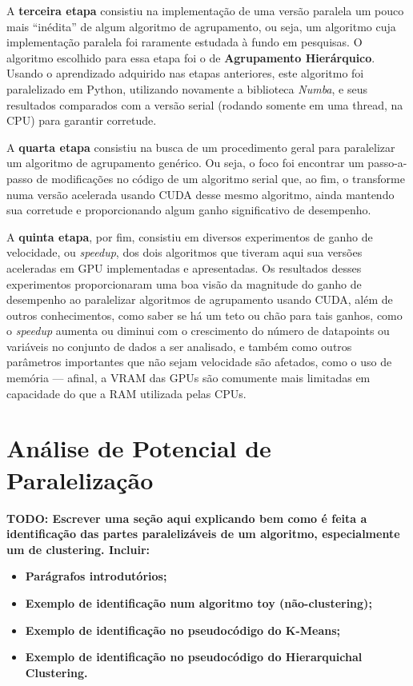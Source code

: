 \documentclass[12pt,
openright, 
oneside, %
a4paper,    %
brazil]{facom-ufu-abntex2}
\def\qntAlgrtm{dois}
\begin{document}
A \textbf{terceira etapa} consistiu na implementação de uma versão paralela um pouco mais \enquote{inédita} de algum algoritmo de agrupamento, ou seja, um algoritmo cuja implementação paralela foi raramente estudada à fundo em pesquisas. O algoritmo escolhido para essa etapa foi o de \textbf{Agrupamento Hierárquico}. Usando o aprendizado adquirido nas etapas anteriores, este algoritmo foi paralelizado em Python, utilizando novamente a biblioteca \textit{Numba}, e seus resultados comparados com a versão serial (rodando somente em uma thread, na CPU) para garantir corretude.

A \textbf{quarta etapa} consistiu na busca de um procedimento geral para paralelizar um algoritmo de agrupamento genérico. Ou seja, o foco foi encontrar um passo-a-passo de modificações no código de um algoritmo serial que, ao fim, o transforme numa versão acelerada usando CUDA desse mesmo algoritmo, ainda mantendo sua corretude e proporcionando algum ganho significativo de desempenho.

A \textbf{quinta etapa}, por fim, consistiu em diversos experimentos de ganho de velocidade, ou \textit{speedup}, dos \qntAlgrtm{} algoritmos que tiveram aqui sua versões aceleradas em GPU implementadas e apresentadas. Os resultados desses experimentos proporcionaram uma boa visão da magnitude do ganho de desempenho ao paralelizar algoritmos de agrupamento usando CUDA, além de outros conhecimentos, como saber se há um teto ou chão para tais ganhos, como o \textit{speedup} aumenta ou diminui com o crescimento do número de datapoints ou variáveis no conjunto de dados a ser analisado, e também como outros parâmetros importantes que não sejam velocidade são afetados, como o uso de memória --- afinal, a VRAM das GPUs são comumente mais limitadas em capacidade do que a RAM utilizada pelas CPUs.




\section{Análise de Potencial de Paralelização}
\label{chp:analisePotencParalel}

\textbf{TODO: Escrever uma seção aqui explicando bem como é feita a identificação das partes paralelizáveis de um algoritmo, especialmente um de clustering. Incluir:}

\begin{itemize}
  \item \textbf{Parágrafos introdutórios;}

  \item \textbf{Exemplo de identificação num algoritmo toy (não-clustering);}

  \item \textbf{Exemplo de identificação no pseudocódigo do K-Means;}

  \item \textbf{Exemplo de identificação no pseudocódigo do Hierarquichal Clustering.}
\end{itemize}
\end{document}
